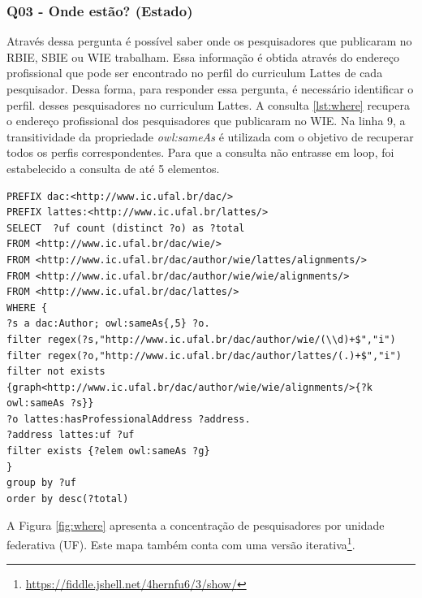 \subsubsection{Q03 - Onde estão? (Estado)}
Através dessa pergunta é possível saber onde os pesquisadores que publicaram no RBIE, SBIE ou WIE trabalham. Essa informação é obtida através do endereço profissional que pode ser encontrado no perfil do curriculum Lattes de cada pesquisador. Dessa forma, para responder essa pergunta, é necessário identificar o perfil. desses pesquisadores no curriculum Lattes.
A consulta \ref{lst:where} recupera o endereço profissional dos pesquisadores que publicaram no WIE. Na linha 9, a transitividade da propriedade \textit{owl:sameAs} é utilizada com o objetivo de recuperar todos os perfis correspondentes. Para que a consulta não entrasse em loop, foi estabelecido a consulta de até 5 elementos.

\begin{lstlisting}[captionpos=b, caption= Consulta para recuperar a concentração de pesquisadores por UF, label=lst:where,
basicstyle=\ttfamily,frame=single]
PREFIX dac:<http://www.ic.ufal.br/dac/>
PREFIX lattes:<http://www.ic.ufal.br/lattes/>
SELECT  ?uf count (distinct ?o) as ?total
FROM <http://www.ic.ufal.br/dac/wie/>
FROM <http://www.ic.ufal.br/dac/author/wie/lattes/alignments/>
FROM <http://www.ic.ufal.br/dac/author/wie/wie/alignments/>
FROM <http://www.ic.ufal.br/dac/lattes/>
WHERE {
?s a dac:Author; owl:sameAs{,5} ?o.
filter regex(?s,"http://www.ic.ufal.br/dac/author/wie/(\\d)+$","i")
filter regex(?o,"http://www.ic.ufal.br/dac/author/lattes/(.)+$","i")
filter not exists {graph<http://www.ic.ufal.br/dac/author/wie/wie/alignments/>{?k owl:sameAs ?s}}
?o lattes:hasProfessionalAddress ?address.
?address lattes:uf ?uf
filter exists {?elem owl:sameAs ?g}
}
group by ?uf
order by desc(?total)

\end{lstlisting}

A Figura \ref{fig:where} apresenta a concentração de pesquisadores por unidade federativa (UF). Este mapa também conta com uma versão iterativa\footnote{\url{https://fiddle.jshell.net/4hernfu6/3/show/}}.

